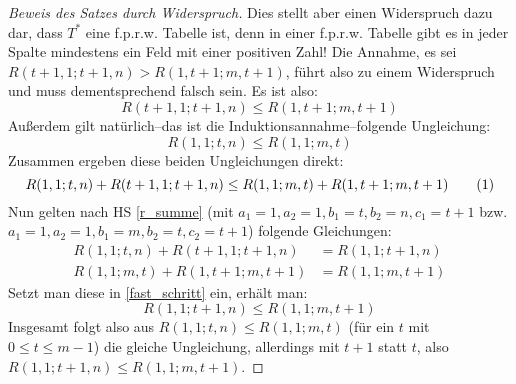 \begin{proof}[Beweis des Satzes durch Widerspruch]
    Dies stellt aber einen Widerspruch dazu dar, dass $T^*$ eine f.p.r.w. Tabelle ist, denn in einer f.p.r.w. Tabelle 
    gibt es in jeder Spalte mindestens ein Feld mit einer positiven Zahl! Die Annahme, es sei $R(t+1, 1; t+1, n)>
    R(1, t+1; m, t+1)$, führt also zu einem Widerspruch und muss dementsprechend falsch sein. Es ist also:
    \[
        R(t+1, 1; t+1, n)\leq R(1, t+1; m, t+1)
    \]
    Außerdem gilt natürlich--das ist die Induktionsannahme--folgende Ungleichung:
    \[
        R(1, 1; t, n)\leq R(1, 1; m, t)
    \]
    Zusammen ergeben diese beiden Ungleichungen direkt:
    \[
        R(1, 1; t, n)+R(t+1, 1; t+1, n)\leq R(1, 1; m, t)+R(1, t+1; m, t+1) \numberthis \label{fast_schritt}
    \]
    Nun gelten nach HS \ref{r_summe} (mit $a_1=1, a_2=1, b_1=t, b_2=n, c_1=t+1$ bzw. $a_1=1, a_2=1, b_1=m, b_2=t, 
    c_2=t+1$) folgende Gleichungen:
    \begin{align*}
        R(1, 1; t, n)+R(t+1, 1; t+1, n)&=R(1, 1; t+1, n)\\
        R(1, 1; m, t)+R(1, t+1; m, t+1)&=R(1, 1; m, t+1)
    \end{align*}
    Setzt man diese in \eqref{fast_schritt} ein, erhält man:
    \[
        R(1, 1; t+1, n)\leq R(1, 1; m, t+1)
    \]
    Insgesamt folgt also aus $R(1, 1; t, n)\leq R(1, 1; m, t)$ (für ein $t$ mit $0\leq t\leq m-1$) die gleiche 
    Ungleichung, allerdings mit $t+1$ statt $t$, also $R(1, 1; t+1, n)\leq R(1, 1; m, t+1)$.


\end{proof}
